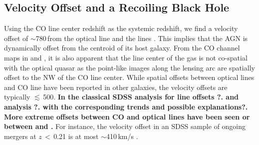 \documentclass[]{emulateapj}
\begin{document}
\subsection{Velocity Offset and a Recoiling Black Hole}
Using the CO line center redshift as the systemic redshift, we find
a velocity offset of $\sim$780\,\kms from the optical
\mgii line and the \oiii lines . This implies that the AGN is dynamically offset from the centroid of its host galaxy. 
From the CO channel maps in  and , it is also apparent that the 
line center of the gas is not co-spatial with the optical quasar as the point-like images
along the lensing arc
are spatially offset to the NW of the CO line center.
While spatial offsets between optical lines and CO line
have been reported in other galaxies, the velocity offsets are typically $\lesssim$\,500\kms.
{\bf
In the classical SDSS analysis for line offsets \citep{Richards02a}?.
\oiii and \mgii analysis \citep{Boroson05a, Bae14a}?.
with the corresponding trends and possible explanations?.
More extreme offsets between CO and optical lines have been seen \citep{Hainline04a} 
or between \cii and \mgii \citep[\eg][]{Venemans16a}.}
For instance, the
velocity offset in
an SDSS sample of ongoing mergers at $z$\,$<$\,0.21 is at most $\sim$410\,km/s \citep{Comerford14a}.
\end{document}
